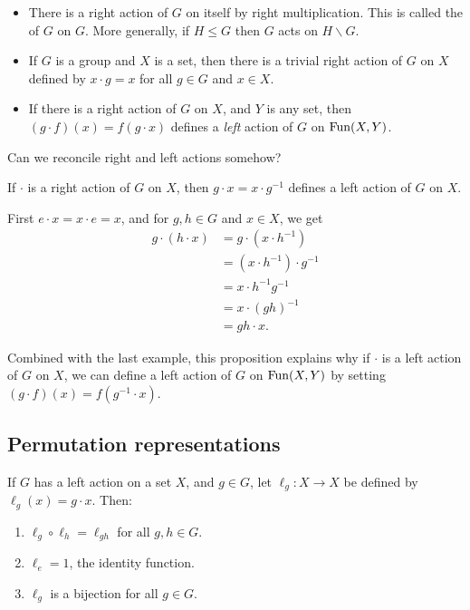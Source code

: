 \documentclass[12pt,letterpaper]{report}
\begin{document}
\begin{ex}
  \begin{itemize}
    \item There is a right action of $G$ on itself by right multiplication.
    This is called the  of $G$ on $G$.
    More generally, if $H \leq G$ then $G$ acts on $H \backslash G$.
    \item If $G$ is a group and $X$ is a set, then there is a trivial right action of $G$ on $X$
    defined by $x \cdot g = x$ for all $g \in G$ and $x \in X$.
    \item If there is a right action of $G$ on $X$, and $Y$ is any set, then
    $(g \cdot f)(x) = f(g \cdot x)$ defines a \emph{left} action of $G$ on $\operatorname{Fun}(X, Y)$.
  \end{itemize}
\end{ex}

Can we reconcile right and left actions somehow?

\begin{prop}{}{}
  If $\cdot$ is a right action of $G$ on $X$, then $g \cdot x = x \cdot g^{-1}$ defines a left
  action of $G$ on $X$.
\end{prop}

\begin{thmproof}
  First $e \cdot x = x \cdot e = x$, and for $g, h \in G$ and $x \in X$, we get
  \begin{align*}
    g \cdot (h \cdot x)
    &= g \cdot (x \cdot h^{-1}) \\
    &= (x \cdot h^{-1}) \cdot g^{-1} \\
    &= x \cdot h^{-1}g^{-1} \\
    &= x \cdot (gh)^{-1} \\
    &= gh \cdot x.
  \end{align*}
\end{thmproof}

Combined with the last example, this proposition explains why if $\cdot$ is a left action of $G$
on $X$, we can define a left action of $G$ on $\operatorname{Fun}(X, Y)$ by setting
$(g \cdot f)(x) = f(g^{-1} \cdot x)$.

\pagebreak
\subsection{Permutation representations}

\begin{lem}{}{}
  If $G$ has a left action on a set $X$, and $g \in G$, let $\ell_g \colon X \to X$ be defined by
  $\ell_g(x) = g \cdot x$.
  Then:
  \begin{enumerate}
    \item $\ell_g \circ \ell_h = \ell_{gh}$ for all $g, h \in G$.
    \item $\ell_e = 1$, the identity function.
    \item $\ell_g$ is a bijection for all $g \in G$.
  \end{enumerate}
\end{lem}
\end{document}
